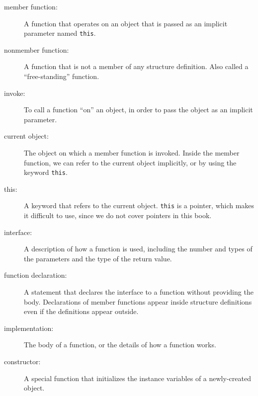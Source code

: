 \begin{description}

\item[member function:]  A function that operates on an object
that is passed as an implicit parameter named {\tt this}.

\item[nonmember function:]  A function that is not a member
of any structure definition.  Also called a ``free-standing''
function.

\item[invoke:] To call a function ``on'' an object, in order to
pass the object as an implicit parameter.

\item[current object:]  The object on which a member function
is invoked.  Inside the member function, we can refer to the
current object implicitly, or by using the keyword {\tt this}.

\item[this:]  A keyword that refers to the current object.
{\tt this} is a pointer, which makes it difficult to use, since
we do not cover pointers in this book.

\item[interface:] A description of how a function is used, including
the number and types of the parameters and the type of the return
value.

\item[function declaration:] A statement that declares the interface
to a function without providing the body.  Declarations of
member functions appear inside structure definitions even if the
definitions appear outside.

\item[implementation:] The body of a function, or the details of how
a function works.

\item[constructor:] A special function that initializes the instance
variables of a newly-created object.


\end{description}

